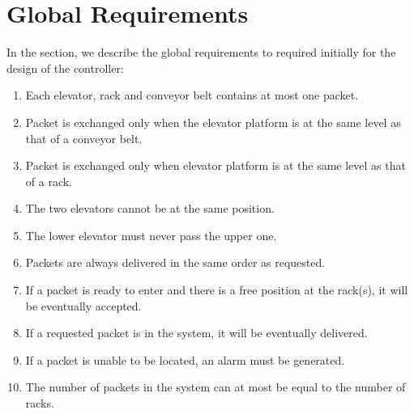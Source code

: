 \section*{Global Requirements}
\label{sec:global_req}
In the section, we describe the global requirements to required initially for the design of the controller:
\begin{enumerate}
\item Each elevator, rack and conveyor belt contains at most one packet.
\item Packet is exchanged only when the elevator platform is at the same level as that of a conveyor belt.
\item Packet is exchanged only when elevator platform is at the same level as that of a rack.
\item The two elevators cannot be at the same position.
\item The lower elevator must never pass the upper one.
\item Packets are always delivered in the same order as requested.
\item If a packet is ready to enter and there is a free position at the rack(s), it will be eventually accepted.
\item If a requested packet is in the system, it will be eventually delivered. %
\item If a packet is unable to be located, an alarm must be generated.
\item The number of packets in the system can at most be equal to the number of racks.
 



\end{enumerate}